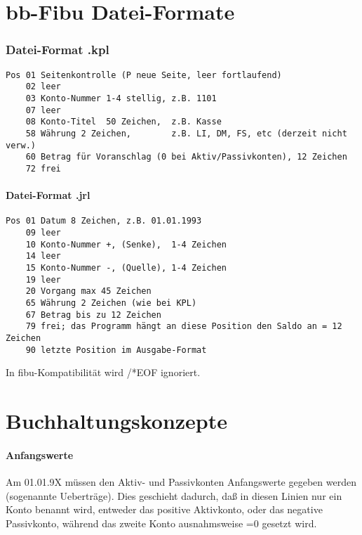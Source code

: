 \documentclass[12pt]{report}
\begin{document}
\begin{appendix}

\chapter{bb-Fibu Datei-Formate}

\subsection{Datei-Format .kpl}

\begin{verbatim}
Pos 01 Seitenkontrolle (P neue Seite, leer fortlaufend)
    02 leer
    03 Konto-Nummer 1-4 stellig, z.B. 1101 
    07 leer
    08 Konto-Titel  50 Zeichen,  z.B. Kasse
    58 Währung 2 Zeichen,        z.B. LI, DM, FS, etc (derzeit nicht verw.)
    60 Betrag für Voranschlag (0 bei Aktiv/Passivkonten), 12 Zeichen
    72 frei
\end{verbatim}

\subsubsection{Datei-Format .jrl}

\begin{verbatim}
Pos 01 Datum 8 Zeichen, z.B. 01.01.1993
    09 leer 
    10 Konto-Nummer +, (Senke),  1-4 Zeichen
    14 leer
    15 Konto-Nummer -, (Quelle), 1-4 Zeichen
    19 leer
    20 Vorgang max 45 Zeichen
    65 Währung 2 Zeichen (wie bei KPL)
    67 Betrag bis zu 12 Zeichen 
    79 frei; das Programm hängt an diese Position den Saldo an = 12 Zeichen
    90 letzte Position im Ausgabe-Format
\end{verbatim}

In fibu-Kompatibilität wird /*EOF ignoriert. 

			      \chapter{Buchhaltungskonzepte}

\subsubsection{Anfangswerte}

\label{Anfangswerte}

Am 01.01.9X müssen den Aktiv- und Passivkonten Anfangswerte gegeben werden
(sogenannte Ueberträge).  Dies geschieht dadurch, daß in diesen Linien nur
ein Konto benannt wird, entweder das positive Aktivkonto, oder das negative
Passivkonto, während das zweite Konto ausnahmsweise =0 gesetzt wird.


\end{appendix}
\end{document}
